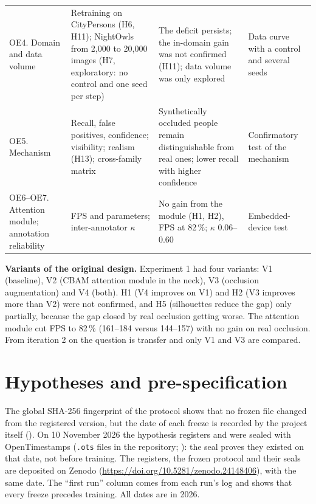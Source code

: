 \documentclass[10pt]{article}
\begin{document}
\begin{table}[H]
\begin{tabular}{@{}p{3.3cm}p{4.6cm}p{5.4cm}p{2.6cm}@{}}
OE4. Domain and data volume & Retraining on CityPersons (H6, H11); NightOwls from 2,000 to 20,000 images (H7, exploratory: no control and one seed per step) & The deficit persists; the in-domain gain was not confirmed (H11); data volume was only explored & Data curve with a control and several seeds \\
OE5. Mechanism & Recall, false positives, confidence; visibility; realism (H13); cross-family matrix & Synthetically occluded people remain distinguishable from real ones; lower recall with higher confidence & Confirmatory test of the mechanism \\
OE6--OE7. Attention module; annotation reliability & FPS and parameters; inter-annotator $\kappa$ & No gain from the module (H1, H2), FPS at 82\,\%; $\kappa$ 0.06--0.60 & Embedded-device test \\
\bottomrule\end{tabular}\end{table}

\noindent\textbf{Variants of the original design.} Experiment 1 had four variants: V1 (baseline), V2 (CBAM attention module in the neck), V3 (occlusion augmentation) and V4 (both). H1 (V4 improves on V1) and H2 (V3 improves more than V2) were not confirmed, and H5 (silhouettes reduce the gap) only partially, because the gap closed by real occlusion getting worse. The attention module cut FPS to 82\,\% (161--184 versus 144--157) with no gain on real occlusion. From iteration 2 on the question is transfer and only V1 and V3 are compared.

\section{Hypotheses and pre-specification}
The global SHA-256 fingerprint of the protocol shows that no frozen file changed from the registered version, but the date of each freeze is recorded by the project itself (). On 10 November 2026 the hypothesis registers and  were sealed with OpenTimestamps (\texttt{.ots} files in the repository; ): the seal proves they existed on that date, not before training. The registers, the frozen protocol and their seals are deposited on Zenodo (\url{https://doi.org/10.5281/zenodo.24148406}), with the same date. The ``first run'' column comes from each run's log and shows that every freeze precedes training. All dates are in 2026.


\end{document}
